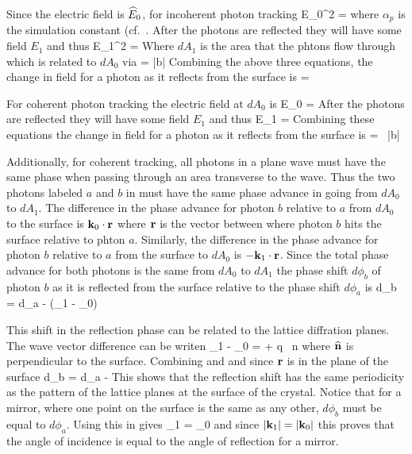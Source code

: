 Since the electric field is $\widehat E_0$, for incoherent photon
tracking
\Begineq
  \what E_0^2 = 
\Endeq
where $\alpha_p$ is the simulation constant (cf.~. 
After the photons are reflected they will have some field $E_1$ and thus
\Begineq
  \what E_1^2 = 
\Endeq
Where $dA_1$ is the area that the phtons flow through which is related
to $dA_0$ via
\Begineq
   = \frac{\bfk_1 \cdot \bfz}{\bfk_0 \cdot \bfz} \equiv |b|
\Endeq
Combining the above three equations, the change in field for a photon
as it reflects from the surface is
\Begineq
   =  \,  
  \qquad {}
\Endeq

For coherent photon tracking the electric field at $dA_0$ is
\Begineq
  \what E_0 = 
\Endeq
After the photons are reflected they will have some field $E_1$ and thus
\Begineq
  \what E_1 = 
\Endeq
Combining these equations the change in field for a photon
as it reflects from the surface is
\Begineq
   =  \, |b| 
  \qquad {}
\Endeq

Additionally, for coherent tracking, all photons in a plane wave must
have the same phase when passing through an area transverse to the
wave. Thus the two photons labeled $a$ and $b$ in
 must have the same phase advance in going from
$dA_0$ to $dA_1$. The difference in the phase advance for photon $b$
relative to $a$ from $dA_0$ to the surface is ${\bf k}_0 \cdot {\bf r}$
where ${\bf r}$ is the vector between where photon $b$ hits the surface
relative to phton $a$. Similarly, the difference in the phase advance
for photon $b$ relative to $a$ from the surface to $dA_0$ is $-{\bf k}_1
\cdot {\bf r}$. Since the total phase advance for both photons is the
same from $dA_0$ to $dA_1$ the phase shift $d\phi_b$ of photon $b$ as
it is reflected from the surface relative to the phase shift $d\phi_a$
is
\Begineq
  d\phi_b = d\phi_a - (\bfk_1 - \bfk_0) \cdot \bfr
  \label{dpbdpa}
\Endeq

This shift in the reflection phase can be related to the lattice
diffration planes. The wave vector difference can be writen
\Begineq
  \bfk_1 - \bfk_0 = \bfH + q \, \bfhat n
  \label{k1k0}
\Endeq
where ${\widehat{\bf n}}$ is perpendicular to the surface. Combining
 and  and since ${\bf r}$ is in
the plane of the surface
\Begineq
  d\phi_b = d\phi_a - \bfH \cdot \bfr
\Endeq
This shows that the reflection shift has the same periodicity as the
pattern of the lattice planes at the surface of the crystal. Notice
that for a mirror, where one point on the surface is the same as any
other, $d\phi_b$ must be equal to $d\phi_a$. Using this in 
gives 
\Begineq
  \bfk_1 \cdot \bfr = \bfk_0 \cdot \bfr
\Endeq
and since $|{\bf k}_1| = |{\bf k}_0|$ this proves that the angle of
incidence is equal to the angle of reflection for a mirror.

